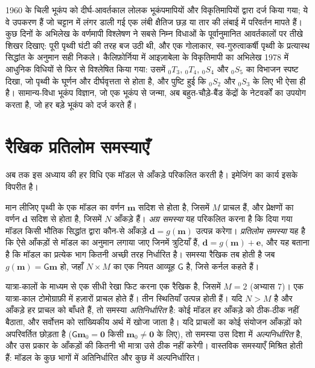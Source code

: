 \begin{history}[चिली के भूकंप के बाद पृथ्वी]
1960 के चिली भूकंप को दीर्घ-आवर्तकाल लोलक भूकंपमापियों
और विकृतिमापियों द्वारा दर्ज किया गया; ये वे उपकरण हैं जो चट्टान में
लंगर डाली गई एक लंबी क्षैतिज छड़ या तार की लंबाई में परिवर्तन मापते हैं। कुछ दिनों के
अभिलेख के वर्णमापी विश्लेषण ने सबसे निम्न विधाओं के पूर्वानुमानित आवर्तकालों पर तीखे शिखर दिखाए:
पूरी पृथ्वी घंटी की तरह बज उठी थी, और एक गोलाकार, स्व-गुरुत्वाकर्षी
पृथ्वी के प्रत्यास्थ सिद्धांत के अनुमान सही निकले। कैलिफ़ोर्निया में आइज़ाबेला के
विकृतिमापी का अभिलेख 1978 में आधुनिक विधियों से फिर से विश्लेषित किया गया:
उसमें ${}_0T_3$, ${}_0T_4$, ${}_0S_4$ और ${}_0S_5$ का विभाजन स्पष्ट दिखा,
जो पृथ्वी के घूर्णन और दीर्घवृत्तता से होता है, और पुष्टि हुई कि
${}_0S_2$ और ${}_0S_3$ के लिए भी ऐसा ही है।
सामान्य-विधा भूकंप विज्ञान, जो एक भूकंप से जन्मा, अब बहुत-चौड़े-बैंड केंद्रों के
नेटवर्कों का उपयोग करता है, जो हर बड़े भूकंप को दर्ज करते हैं।
\end{history}

\section{रैखिक प्रतिलोम समस्याएँ}\label{sec:b3:seismology-imaging:inverse}

अब तक इस अध्याय की हर विधि एक मॉडल से आँकड़े परिकलित करती है। इमेजिंग का कार्य
इसके विपरीत है।

\begin{definition}\label{def:b3:seismology-imaging:inverse}
मान लीजिए पृथ्वी के एक मॉडल का वर्णन $\mathbf m$ सदिश से होता है, जिसमें $M$ प्राचल हैं,
और प्रेक्षणों का वर्णन $\mathbf d$ सदिश से होता है, जिसमें $N$ आँकड़े हैं। \emph{अग्र
समस्या} यह परिकलित करना है कि दिया गया मॉडल किसी भौतिक सिद्धांत द्वारा
कौन-से आँकड़े $\mathbf d = g(\mathbf m)$ उत्पन्न करेगा। \emph{प्रतिलोम
समस्या} यह है कि ऐसे आँकड़ों से मॉडल का अनुमान लगाया जाए जिनमें त्रुटियाँ हैं,
$\mathbf d = g(\mathbf m) + \mathbf e$, और यह बताना है कि मॉडल का प्रत्येक भाग कितनी अच्छी तरह निर्धारित है।
समस्या रैखिक तब होती है जब $g(\mathbf m) =
\mathsf G\mathbf m$ हो, जहाँ $N\times M$ का एक नियत आव्यूह $\mathsf G$ है, जिसे कर्नल कहते हैं।
\end{definition}

यात्रा-कालों के माध्यम से एक सीधी रेखा फिट करना एक रैखिक  है, जिसमें
$M = 2$ (अभ्यास 7)। एक यात्रा-काल टोमोग्राफ़ी में हज़ारों प्राचल होते हैं। तीन
स्थितियाँ उत्पन्न होती हैं। यदि $N > M$ है और आँकड़े हर प्राचल को बाँधते हैं,
तो समस्या \emph{अतिनिर्धारित} है: कोई मॉडल हर आँकड़े को ठीक-ठीक नहीं बैठाता,
और सर्वोत्तम को सांख्यिकीय अर्थ में खोजा जाता है। यदि प्राचलों का कोई संयोजन आँकड़ों को अपरिवर्तित
छोड़ता है ($\mathsf G\mathbf m_0 = \mathbf 0$ किसी
$\mathbf m_0 \ne \mathbf 0$ के लिए), तो समस्या उस दिशा में \emph{अल्पनिर्धारित} है,
और उस प्रकार के आँकड़ों की कितनी भी मात्रा उसे ठीक नहीं करेगी। वास्तविक समस्याएँ मिश्रित होती हैं:
मॉडल के कुछ भागों में अतिनिर्धारित और
कुछ में अल्पनिर्धारित।


